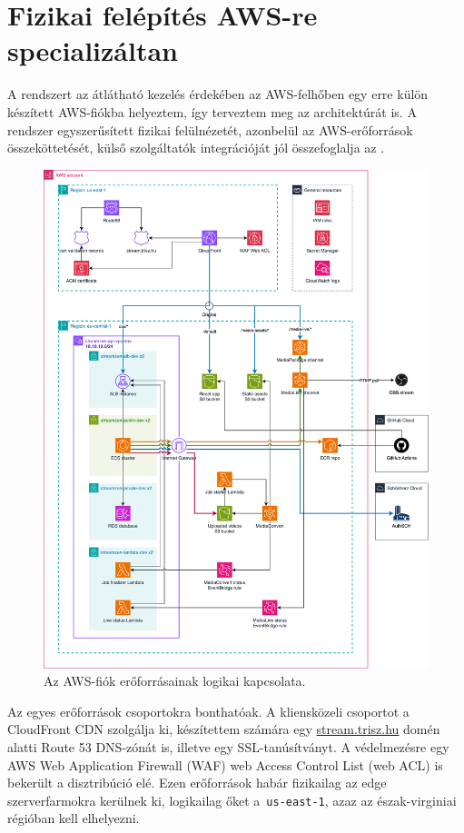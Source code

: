 \section{Fizikai felépítés AWS-re specializáltan}

A rendszert az átlátható kezelés érdekében az AWS-felhőben egy erre külön készített AWS-fiókba helyeztem, így terveztem meg az architektúrát is. A rendszer egyszerűsített fizikai felülnézetét, azonbelül az AWS-erőforrások összeköttetését, külső szolgáltatók integrációját jól összefoglalja az .

\begin{figure}
	\centering
	\includegraphics[width=160mm, keepaspectratio]{figures/dipterv_architect.png}
	\caption{Az AWS-fiók erőforrásainak logikai kapcsolata.}
	\label{fig:architect}
\end{figure}

Az egyes erőforrások csoportokra bonthatóak. A kliensközeli csoportot a CloudFront CDN szolgálja ki, készítettem számára egy \url{stream.trisz.hu} domén alatti Route 53 DNS\leavevmode\hbox{-}zónát is, illetve egy SSL-tanúsítványt. A védelmezésre egy AWS Web Application Firewall (WAF) web Access Control List (web ACL) is bekerült a disztribúció elé. Ezen erőforrások habár fizikailag az edge szerverfarmokra kerülnek ki, logikailag őket a~\verb|us-east-1|, azaz az észak-virginiai régióban kell elhelyezni.

